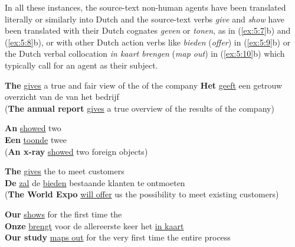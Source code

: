 \documentclass[output=paper]{LSP/langsci}
\begin{document}
In all these instances, the source-text non-human agents have been translated literally or similarly into Dutch and the source-text verbs \textit{give} and \textit{show} have been translated with their Dutch cognates \textit{geven} or \textit{tonen}, as in (\ref{ex:5:7}b) and (\ref{ex:5:8}b), or with other Dutch action verbs like \textit{bieden} (\textit{offer}) in (\ref{ex:5:9}b) or the Dutch verbal collocation \textit{in kaart brengen} (\textit{map out}) in (\ref{ex:5:10}b) which typically call for an agent as their subject.      

\ea \label{ex:5:7}
\ea
\textbf{The}  \ul{gives} a true and fair view of the  of the company
\ex
\textbf{Het}  \ul{geeft} een getrouw overzicht van de  van het bedrijf\\
(\textbf{The annual report} \ul{gives} a true overview of the results of the company)
\z
\z



\ea \label{ex:5:8}
\ea
\textbf{An}  \ul{showed} two \\[1em]
\ex \textbf{Een}  \ul{toonde} twee \\
(\textbf{An x-ray} \ul{showed} two foreign objects)
\z
\z


\newpage


\ea \label{ex:5:9} 
\ea
\textbf{The}  \ul{gives}  the  to meet customers\\[1em]
\ex
\textbf{De}  \ul{zal}  de  \ul{bieden} bestaande klanten te ontmoeten\\
(\textbf{The World Expo} \ul{will offer} us the possibility to meet existing customers)
\z
\z


\ea \label{ex:5:10}
\ea
\textbf{Our}  \ul{shows} for the first time the \\[1em]
\ex
\textbf{Onze}  \ul{brengt} voor de allereerste keer het  \ul{in kaart}\\
\textbf{Our study} \ul{maps out} for the very first time the entire process
\z
\z
\end{document}
